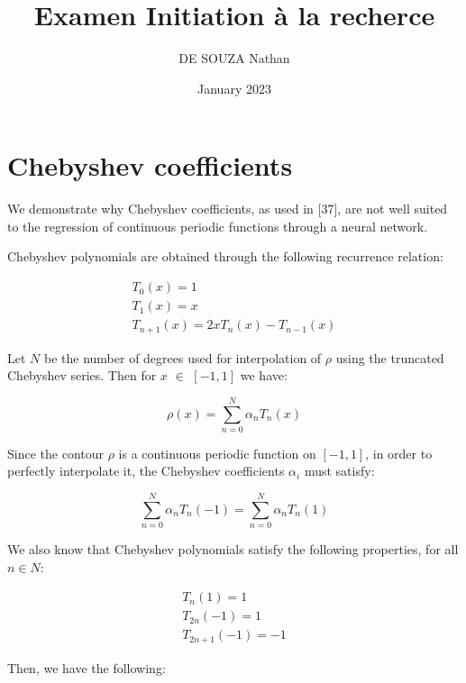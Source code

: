 \documentclass[10pt,twocolumn]{article}
\title{Examen Initiation à la recherce}
\author{DE SOUZA Nathan}
\date{January 2023}
\begin{document}
\section{Chebyshev coefficients}


    We demonstrate why Chebyshev coefficients, as used
in [37], are not well suited to the regression of continuous
periodic functions through a neural network.

Chebyshev polynomials are obtained through the following
recurrence relation:

\begin{equation}
    \begin{array}{c}
          T_0 \left(x\right) = 1 \\ 
          T_1 \left(x\right) = x \\
          T_{n+1} \left(x\right) = 2 x T_n \left(x\right) - T_{n-1} \left(x\right)
    \end{array}
\end{equation}

Let $N$ be the number of degrees used for interpolation of $\rho$ using the truncated Chebyshev series. Then for $x$ $\in$ $\left[ -1, 1 \right] $ we have:

\begin{equation}
    \rho \left(x\right) = \sum_{n=0}^{N} \alpha_n T_n \left(x\right)
\end{equation}

Since the contour $\rho$ is a continuous periodic function on
$\left[ -1, 1 \right] $, in order to perfectly interpolate it, the Chebyshev
coefficients $\alpha_i$ must satisfy:

\begin{equation}
    \sum_{n=0}^{N} \alpha_n T_n \left(-1\right) = \sum_{n=0}^{N} \alpha_n T_n \left(1\right)
\end{equation}

We also know that Chebyshev polynomials satisfy the
following properties, for all $n \in N $:

\begin{equation}
    \begin{array}{c}
          T_n \left(1\right) = 1 \\ 
          T_{2n} \left(-1\right) = 1 \\
          T_{2n+1} \left(-1\right) = -1
    \end{array}
\end{equation}

Then, we have the following:
\end{document}
